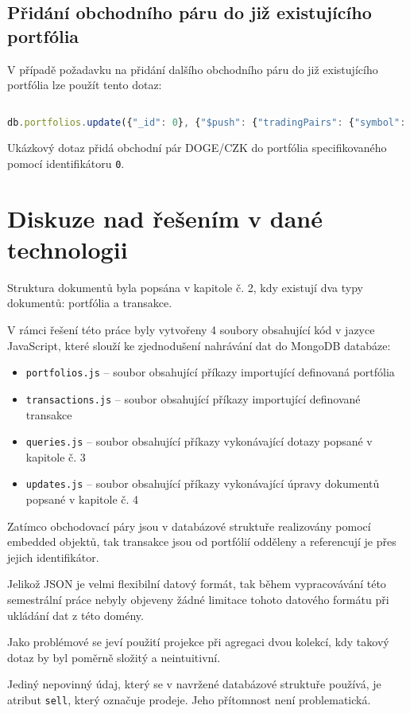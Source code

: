 \documentclass[12pt, a4paper]{article}
\let\oldsection\section
\renewcommand\section{\clearpage\oldsection}
\begin{document}
\subsection{Přidání obchodního páru do již existujícího portfólia}
V případě požadavku na přidání dalšího obchodního páru do již existujícího portfólia lze použít tento dotaz:

\begin{lstlisting}[language=JavaScript]

db.portfolios.update({"_id": 0}, {"$push": {"tradingPairs": {"symbol": "doge", "currency": "czk"}}})

\end{lstlisting}

Ukázkový dotaz přidá obchodní pár DOGE/CZK do portfólia specifikovaného pomocí identifikátoru \texttt{0}.


\section{Diskuze nad řešením v dané technologii}
Struktura dokumentů byla popsána v kapitole č. 2, kdy existují dva typy dokumentů: portfólia a transakce. 

V rámci řešení této práce byly vytvořeny 4 soubory obsahující kód v jazyce JavaScript, které slouží ke zjednodušení nahrávání dat do MongoDB databáze:

\begin{itemize}
    \item \texttt{portfolios.js} -- soubor obsahující příkazy importující definovaná portfólia
    \item \texttt{transactions.js} -- soubor obsahující příkazy importující definované transakce
    \item \texttt{queries.js} -- soubor obsahující příkazy vykonávající dotazy popsané v kapitole č. 3
    \item \texttt{updates.js} -- soubor obsahující příkazy vykonávající úpravy dokumentů popsané v kapitole č. 4
\end{itemize}

Zatímco obchodovací páry jsou v databázové struktuře realizovány pomocí embedded objektů, tak transakce jsou od portfólií odděleny a referencují je přes jejich identifikátor.

Jelikož JSON je velmi flexibilní datový formát, tak během vypracovávání této semestrální práce nebyly objeveny žádné limitace tohoto datového formátu při ukládání dat z této domény.

Jako problémové se jeví použití projekce při agregaci dvou kolekcí, kdy takový dotaz by byl poměrně složitý a neintuitivní.

Jediný nepovinný údaj, který se v navržené databázové struktuře používá, je atribut \texttt{sell}, který označuje prodeje. Jeho přítomnost není problematická.
\end{document}

